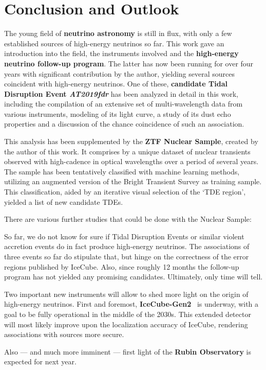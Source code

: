 \chapter*{Conclusion and Outlook}\label{conclusion}
The young field of \textbf{neutrino astronomy} is still in flux, with only a few established sources of high-energy neutrinos so far. This work gave an introduction into the field, the instruments involved and the \textbf{high-energy neutrino follow-up program}. The latter has now been running for over four years with significant contribution by the author, yielding several sources coincident with high-energy neutrinos. One of these, \textbf{candidate Tidal Disruption Event \textit{AT2019fdr}} has been analyzed in detail in this work, including the compilation of an extensive set of multi-wavelength data from various instruments, modeling of its light curve, a study of its dust echo properties and a discussion of the chance coincidence of such an association.

This analysis has been supplemented by the \textbf{ZTF Nuclear Sample}, created by the author of this work. It comprises by a unique dataset of nuclear transients observed with high-cadence in optical wavelengths over a period of several years. The sample has been tentatively classified with machine learning methods, utilizing an augmented version of the Bright Transient Survey as training sample. This classification, aided by an iterative visual selection of the `TDE region', yielded a list of new candidate TDEs.

There are various further studies that could be done with the Nuclear Sample:

So far, we do not know for sure if Tidal Disruption Events or similar violent accretion events do in fact produce high-energy neutrinos. The associations of three events so far do stipulate that, but hinge on the correctness of the error regions published by IceCube. Also, since roughly 12 months the follow-up program has not yielded any promising candidates. Ultimately, only time will tell.

Two important new instruments will allow to shed more light on the origin of high-energy neutrinos. First and foremost, \textbf{IceCube-Gen2}~ is underway, with a goal to be fully operational in the middle of the 2030s. This extended detector will most likely improve upon the localization accuracy of IceCube, rendering associations with sources more secure.

Also --- and much more imminent --- first light of the \textbf{Rubin Observatory} is expected for next year.